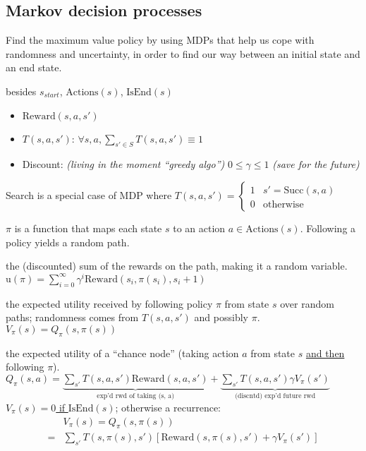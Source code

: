 \subsection{Markov decision processes}

Find the maximum value policy by using MDPs that help us cope with randomness
and uncertainty, in order to find our way between an initial state and an end
state.

 besides $s_{start}$, $\text{Actions}(s)$, $\text{IsEnd}(s)$
\begin{itemize}
    \item $\text{Reward}(s,a,s')$
    \item $T(s,a,s')$: $\forall s,a, \sum_{s'\in S} T(s,a,s') \equiv 1$
    \item Discount: \emph{(living in the moment ``greedy algo'')} $0 \le \gamma \le 1$ \emph{(save for the future)}
\end{itemize}
Search is a special case of MDP where $T(s,a,s') = \begin{cases}
    1 & s' = \text{Succ}(s,a) \\
    0 & \text{otherwise}
\end{cases}$

 $\pi$ is a function that maps each state $s$ to an action $a \in
\text{Actions}(s)$. Following a policy yields a random path.

 the (discounted) sum of the rewards on the
path, making it a random variable.
$\text{u}(\pi) = \sum_{i=0}^{\infty} \gamma^i \text{Reward}(s_i, \pi(s_i), s_i + 1)$

 the expected utility received by
following policy $\pi$ from state $s$ over random paths; randomness comes from
$T(s,a,s')$ and possibly $\pi$. $V_\pi(s) = Q_\pi(s,\pi(s))$

 the expected utility of a ``chance node'' (taking action $a$ from
state $s$ \underline{and then} following $\pi$).
$Q_\pi(s,a)
= \underbrace{\sum_{s'}T(s,a,s') \text{Reward}(s,a,s')}_{\text{exp'd rwd of taking (s, a)}}
+ \underbrace{\sum_{s'}T(s,a,s') \gamma V_\pi(s')}_{\text{(discntd) exp'd future rwd}}$
\underline{$V_\pi(s) = 0$ if $\text{IsEnd}(s)$};
otherwise a recurrence:
\begin{displaymath}
\boxed{
\begin{aligned}
    &V_\pi(s) = Q_\pi(s,\pi(s)) \\
    =&\sum_{s'}T(s,\pi(s),s')\left[\text{Reward}(s,\pi(s),s') + \gamma V_\pi(s')\right]
\end{aligned}
}
\end{displaymath}

